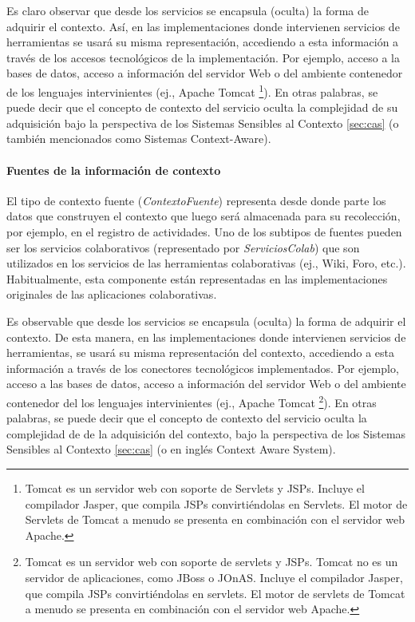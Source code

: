 Es claro observar que desde los servicios se encapsula (oculta) la forma de
adquirir el contexto. Así, en las implementaciones
donde intervienen servicios de herramientas se usará su misma
representación, accediendo a esta información a través de los accesos
tecnológicos de la implementación. Por ejemplo, acceso a la bases de datos,
acceso a información del servidor Web o del ambiente contenedor de los
lenguajes intervinientes (ej., Apache Tomcat \footnote{Tomcat es un servidor web
con soporte de Servlets y JSPs. Incluye el compilador Jasper, que compila JSPs
convirtiéndolas en
Servlets. El motor de Servlets de Tomcat a menudo se presenta en combinación con
el servidor web Apache.}). En otras palabras, se puede decir que el concepto de
contexto del servicio oculta la complejidad de su adquisición
bajo la perspectiva de los Sistemas Sensibles al Contexto \ref{sec:cas} (o
también mencionados como Sistemas Context-Aware).


\paragraph{Fuentes de la información de contexto}

El tipo de contexto fuente (\textit{ContextoFuente}) representa desde donde
parte los datos que construyen el contexto que luego será almacenada para su recolección, por ejemplo, en el registro de actividades. Uno de los subtipos de fuentes pueden ser los servicios colaborativos (representado por \textit{ServiciosColab}) que son utilizados en los servicios de las herramientas colaborativas (ej., Wiki, Foro, etc.). Habitualmente, esta componente están representadas en las implementaciones originales de las aplicaciones colaborativas.

Es observable que desde los servicios se encapsula (oculta) la forma de
adquirir el contexto. De esta manera, en las implementaciones
donde intervienen servicios de herramientas, se usará su misma
representación del contexto, accediendo a esta información a través de los conectores
tecnológicos implementados. Por ejemplo, acceso a las bases de datos,
acceso a información del servidor Web o del ambiente contenedor del los
lenguajes intervinientes (ej., Apache Tomcat \footnote{Tomcat es un servidor web
con soporte de servlets y JSPs. Tomcat no es un servidor de aplicaciones, como
JBoss o JOnAS. Incluye el compilador Jasper, que compila JSPs convirtiéndolas en
servlets. El motor de servlets de Tomcat a menudo se presenta en combinación con
el servidor web Apache.}). En otras palabras, se puede decir que el concepto de
contexto del servicio oculta la complejidad de de la adquisición del contexto,
bajo la perspectiva de los Sistemas Sensibles al Contexto \ref{sec:cas} (o en
inglés Context Aware System).


